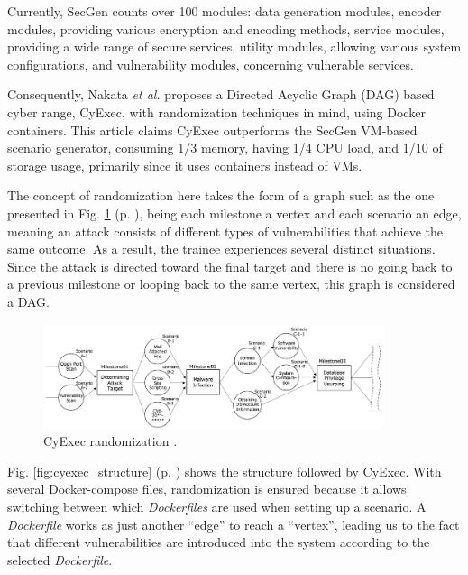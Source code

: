 Currently, SecGen counts over 100 modules: data generation modules, encoder modules, providing various encryption and encoding methods, service modules, providing a wide range of secure services, utility modules, allowing various system configurations, and vulnerability modules, concerning vulnerable services. 


Consequently, Nakata \textit{et al.} \cite{cyexec_ref} proposes a Directed Acyclic Graph (DAG) based cyber range, CyExec, with randomization techniques in mind, using Docker containers. This article claims CyExec outperforms the SecGen VM-based scenario \cite{secgen_ref} generator, consuming 1/3 memory, having 1/4 CPU load, and 1/10 of storage usage, primarily since it uses containers instead of VMs.

The concept of randomization here takes the form of a graph such as the one presented in Fig. \ref{fig:cyexec_randomization} (p. \pageref{fig:cyexec_randomization}), being each milestone a vertex and each scenario an edge, meaning an attack consists of different types of vulnerabilities that achieve the same outcome. As a result, the trainee experiences several distinct situations. Since the attack is directed toward the final target and there is no going back to a previous milestone or looping back to the same vertex, this graph is considered a DAG.

\begin{figure}[H]
    \includegraphics[width=10cm]{figures/cyexec_randomization.png}
    \caption{CyExec randomization \cite{cyexec_ref}.}
    \label{fig:cyexec_randomization}
\end{figure}

Fig. \ref{fig:cyexec_structure} (p. \pageref{fig:cyexec_structure}) shows the structure followed by CyExec. With several Docker-compose files, randomization is ensured because it allows switching between which \textit{Dockerfiles} are used when setting up a scenario. A \textit{Dockerfile} works as just another ``edge''  to reach a ``vertex'', leading us to the fact that different vulnerabilities are introduced into the system according to the selected \textit{Dockerfile}.

